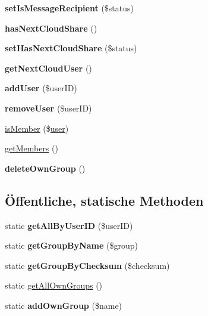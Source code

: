 \begin{DoxyCompactItemize}
{\bfseries set\+Is\+Message\+Recipient} (\$status)
\item 
\mbox{\label{classusergroup_af258249a12b8ba8175fad1bc01de6b05}} 
{\bfseries has\+Next\+Cloud\+Share} ()
\item 
\mbox{\label{classusergroup_a9b7c651f6f62a9180d7a65963d52ccbe}} 
{\bfseries set\+Has\+Next\+Cloud\+Share} (\$status)
\item 
\mbox{\label{classusergroup_a646839b26b8608be100c1ba9a51db159}} 
{\bfseries get\+Next\+Cloud\+User} ()
\item 
\mbox{\label{classusergroup_a455f62aa756e98a63094608644c5bc71}} 
{\bfseries add\+User} (\$user\+ID)
\item 
\mbox{\label{classusergroup_aab40412cf6f52e82a88ef92d5a5ddf51}} 
{\bfseries remove\+User} (\$user\+ID)
\item 
\mbox{\hyperlink{classusergroup_a36cb5091e683ea89dda2dbc4f17a2cbe}{is\+Member}} (\$\mbox{\hyperlink{classuser}{user}})
\item 
\mbox{\hyperlink{classusergroup_aa7a79507fe7cc6fa64e495be5cb893fd}{get\+Members}} ()
\item 
\mbox{\label{classusergroup_ab7186a83a833bf523991f1ade1f09ac2}} 
{\bfseries delete\+Own\+Group} ()
\end{DoxyCompactItemize}
\subsection*{Öffentliche, statische Methoden}
\begin{DoxyCompactItemize}
\item 
\mbox{\label{classusergroup_af9ee7cf51d75313666dea46fe6680f6a}} 
static {\bfseries get\+All\+By\+User\+ID} (\$user\+ID)
\item 
\mbox{\label{classusergroup_a77181c8eaa1b57b497d271997663ae06}} 
static {\bfseries get\+Group\+By\+Name} (\$group)
\item 
\mbox{\label{classusergroup_ac2d1750d10e499b122cab91d34cb727a}} 
static {\bfseries get\+Group\+By\+Checksum} (\$checksum)
\item 
static \mbox{\hyperlink{classusergroup_a44543b94c4d5a71ba233780522b753b9}{get\+All\+Own\+Groups}} ()
\item 
\mbox{\label{classusergroup_ab742d6d491a1372c6e186ac85bc82c39}} 
static {\bfseries add\+Own\+Group} (\$name)
\end{DoxyCompactItemize}


